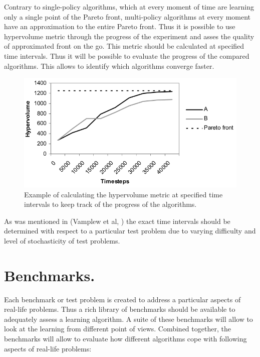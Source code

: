 Contrary to single-policy algorithms, which at every moment of time are learning only a single point of the Pareto front, multi-policy algorithms at every moment have an approximation to the entire Pareto front. Thus it is possible to use hypervolume metric through the progress of the experiment and asses the quality of approximated front on the go. This metric should be calculated at specified time intervals. Thus it will be possible to evaluate the progress of the compared algorithms. This allows to identify which algorithms converge faster. \\

\begin{figure}[ht]
\vskip 0.2in
\centering
\includegraphics[scale=0.9]{2alghypervolumeovertime.png}
\caption{Example of calculating the hypervolume metric at specified time intervals to keep track of the progress of the algorithms.}
\label{ParetoDominance}
\end{figure}

As was mentioned in (Vamplew et al, \cite{VamplewDBID2011}) the exact time intervals should be determined with respect to a particular test problem due to varying difficulty and level of stochasticity of test problems. \\

\section{Benchmarks.}

Each benchmark or test problem is created to address a particular aspects of real-life problems. Thus a rich library of benchmarks should be available to adequately assess a learning algorithm. A suite of these benchmarks will allow to look at the learning from different point of views. Combined together, the benchmarks will allow to evaluate how different algorithms cope with following aspects of real-life problems:

